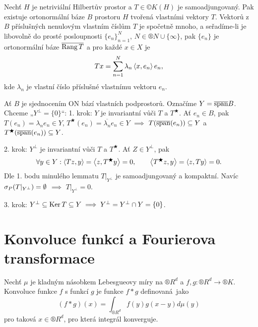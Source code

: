 \documentclass[12pt]{article}					%
\begin{document}
\begin{veta}
	Nechť $H$ je netriviální Hilbertův prostor a $T \in ©K(H)$ je samoadjungovaný. Pak existuje ortonormální báze $B$ prostoru $H$ tvořená vlastními vektory $T$. Vektorů z $B$ příslušných nenulovým vlastním číslům $T$ je spočetně mnoho, a seřadíme-li je libovolně do prosté posloupnosti $\{e_n\}_{n=1}^N$, $N \in ®N \cup \{∞\}$, pak $\{e_n\}$ je ortonormální báze $\overline{\operatorname{Rang} T}$ a pro každé $x \in X$ je
	$$ Tx = \sum_{n=1}^N \lambda_n \left\langle x, e_n\right\rangle e_n, $$
	kde $\lambda_n$ je vlastní číslo příslušné vlastnímu vektoru $e_n$.

	\begin{dukazin}
		Ať $B$ je sjednocením ON bází vlastních podprostorů. Označíme $Y = \overline{\operatorname{span}} B$. Chceme „$Y^\perp = \{0\}$“: 1. krok: $Y$ je invariantní vůči $T$ a $T^\bigstar$. Ať $e_n \in B$, pak $T(e_n) = \lambda_n e_n \in Y$, $T^\bigstar(e_n) = \overline{\lambda_n} e_n \in Y$ $\implies$ $T(\overline{\operatorname{span}} (e_n)) \subseteq Y$ a $T^\bigstar(\overline{\operatorname{span}} (e_n)) \subseteq Y$.

		2. krok: $Y^\perp$ je invariantní vůči $T$ a $T^\bigstar$. Ať $Z \in Y^\perp$, pak
		$$ \forall y \in Y: \left\langle Tz, y\right\rangle = \left\langle z, T^\bigstar y\right\rangle = 0, \qquad \left\langle T^\bigstar z, y\right\rangle = \left\langle z, T y\right\rangle = 0. $$
		Dle 1. bodu minulého lemmatu $T|_{Y^\perp}$ je samoadjungovaný a kompaktní. Navíc $\sigma_P(T|_{Y^\perp}) = \emptyset$ $\implies$ $T|_{Y^\perp} = 0$.

		3. krok: $Y^\perp \subseteq \operatorname{Ker} T \subseteq Y \implies Y^\perp = Y^\perp \cap Y = \{0\}$.
	\end{dukazin}
\end{veta}


\section{Konvoluce funkcí a Fourierova transformace}
\begin{definice}
	Nechť $\mu$ je kladným násobkem Lebesgueovy míry na $®R^d$ a $f, g: ®R^d \rightarrow ®K$. Konvoluce funkce $f$ s funkcí $g$ je funkce $f * g$ definovaná jako
	$$ (f*g)(x) = \int_{®R^d} f(y)g(x - y) d\mu(y) $$
	pro taková $x \in ®R^d$, pro která integrál konverguje.
\end{definice}
\end{document}
